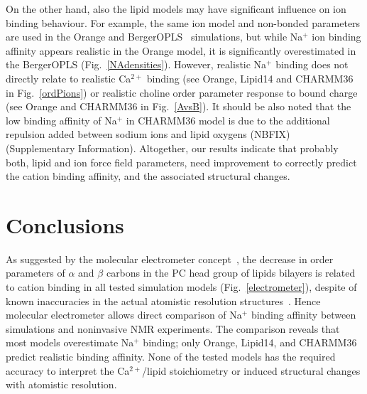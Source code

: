 \documentclass[pre,aps,floatfix,authordate1-4,twocolumn]{revtex4-1}
\begin{document}
On the other hand, also the lipid models may have significant influence on ion binding behaviour.
For example, the same ion model and non-bonded parameters are used in the Orange and BergerOPLS~\cite{tieleman06} 
simulations, but while Na$^+$ ion binding affinity appears realistic in the Orange model, it is significantly overestimated 
in the BergerOPLS (Fig.~\ref{NAdensities}). However, realistic Na$^+$ binding does not directly relate
to realistic Ca$^{2+}$ binding (see Orange, Lipid14 and CHARMM36 in Fig.~\ref{ordPions}) or realistic choline
order parameter response to bound charge (see Orange and CHARMM36 in Fig.~\ref{AvsB}).
It should be also noted that the low binding affinity of Na$^+$ in CHARMM36 model is due to 
the additional repulsion added between sodium ions and lipid oxygens (NBFIX)~\cite{venable13} (Supplementary Information).
Altogether, our results indicate that probably both, lipid and ion force field parameters, need improvement to 
correctly predict the cation binding affinity, and the associated structural changes.








\section{Conclusions}
As suggested by the molecular electrometer concept~\cite{akutsu81,altenbach84,seelig87,scherer89},
the decrease in order parameters of $\alpha$ and $\beta$ carbons in the PC head group of lipids bilayers
is related to cation binding  in all tested simulation models (Fig.~\ref{electrometer}), despite of known inaccuracies 
in the actual atomistic resolution structures~\cite{botan15}. Hence molecular electrometer allows direct comparison
of Na$^+$ binding affinity between simulations and noninvasive NMR experiments.
The comparison reveals that most models overestimate Na$^+$ binding; only Orange, Lipid14, and CHARMM36 
predict realistic binding affinity. None of the tested models has the required accuracy to interpret
the Ca$^{2+}$/lipid stoichiometry or induced structural changes with atomistic resolution.
\end{document}

